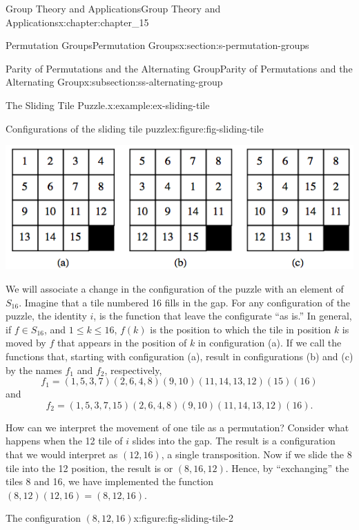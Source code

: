 \documentclass[twoside,10pt,]{book}
\numberwithin{equation}{section}
\begin{document}
\begin{chapterptx}{Group Theory and Applications}{}{Group Theory and Applications}{}{}{x:chapter:chapter_15}
\begin{sectionptx}{Permutation Groups}{}{Permutation Groups}{}{}{x:section:s-permutation-groups}
\begin{subsectionptx}{Parity of Permutations and the Alternating Group}{}{Parity of Permutations and the Alternating Group}{}{}{x:subsection:ss-alternating-group}
\begin{example}{The Sliding Tile Puzzle.}{x:example:ex-sliding-tile}
\begin{figureptx}{Configurations of the sliding tile puzzle}{x:figure:fig-sliding-tile}{}
\begin{image}{0.15}{0.7}{0.15}%
\includegraphics[width=\linewidth]{images/fig-sliding-tile.png}
\end{image}%
\tcblower
\end{figureptx}%
We will associate a change in the configuration of the puzzle with an element of \(S_{16}\). Imagine that a tile numbered 16 fills in the gap. For any configuration of the puzzle, the identity \(i\), is the function that leave the configurate ``as is.''   In general,  if \(f \in S_{16}\), and \(1 \leq  k \leq  16\), \(f(k)\) is the position to which  the tile in position \(k\) is moved by \(f\) that appears in the position of \(k\) in configuration (a). If we call the functions that, starting with configuration (a), result in configurations (b) and (c) by the names \(f_1\) and \(f_2\), respectively,%
\begin{equation*}
f_1 = (1, 5, 3, 7)(2, 6, 4, 8)(9, 10)(11, 14, 13, 12)(15)(16)
\end{equation*}
and%
\begin{equation*}
f_2 = (1, 5, 3, 7, 15)(2, 6, 4, 8)(9, 10)(11, 14, 13, 12)(16).
\end{equation*}
%
\par
How can we interpret the movement of one tile as a permutation?  Consider what happens when the 12 tile of \(i\) slides into the gap. The result is a configuration that we would interpret as \((12,16)\), a single transposition. Now if we slide the 8 tile into the 12 position, the result is or \((8, 16, 12)\). Hence, by ``exchanging'' the tiles 8 and 16, we have implemented the function \((8, 12) (12, 16) = (8, 12, 16)\).%
\begin{figureptx}{The configuration \((8, 12, 16)\)}{x:figure:fig-sliding-tile-2}{}%
\begin{image}{0.3}{0.4}{0.3}%

\end{image}
\end{figureptx}
\end{example}
\end{subsectionptx}
\end{sectionptx}
\end{chapterptx}
\end{document}
